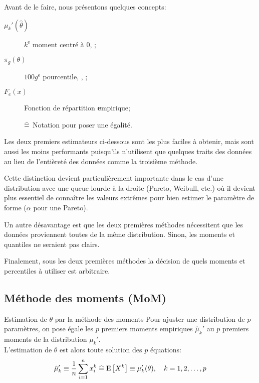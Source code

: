 \documentclass[10pt, french]{article}
\begin{document}
\begin{multicols*}{2}
Avant de le faire, nous présentons quelques concepts:
\begin{distributions}[Terminologie]
\begin{description}
	\item[$\mu_{k}'(\hat{\theta})$]	$k^{\text{e}}$ moment centré à 0, ;
	\item[$\pi_{g}(\theta)$]	$100g^{\text{e}}$ pourcentile, , ;
	\item[$F_{e}(x)$]	Fonction de répartition \textbf{e}mpirique;
	\item[]	$\equalhat$	Notation pour poser une égalité.
\end{description}
\end{distributions}

Les deux premiers estimateurs ci-dessous sont les plus faciles à obtenir, mais sont aussi les moins performants puisqu'ils n'utilisent que quelques traits des données au lieu de l'entièreté des données comme la troisième méthode.

Cette distinction devient particulièrement importante dans le cas d'une distribution avec une queue lourde à la droite (Pareto, Weibull, etc.) où il devient plus essentiel de connaître les valeurs extrêmes pour bien estimer le paramètre de forme ($\alpha$ pour une Pareto).

Un autre désavantage est que les deux premières méthodes nécessitent que les données proviennent toutes de la même distribution. Sinon, les moments et quantiles ne seraient pas clairs.

Finalement, sous les deux premières méthodes la décision de quels moments et percentiles à utiliser est arbitraire.

\subsection{Méthode des moments (MoM)}

\begin{algo}{Estimation de $\theta$ par la méthode des moments}
Pour ajuster une distribution de $p$ paramètres, on pose égale les $p$ premiers moments empiriques $\hat\mu_{k}'$ au $p$ premiers moments de la distribution $\mu_{k}'$.\\
L'estimation de $\theta$ est alors toute solution des $p$ équations:
\begin{equation*}
	\hat{\mu}_{k}' 
	\equiv	\frac{1}{n}\sum_{i = 1}^{n} x_{i}^{k}
	\equalhat	\esp{X^{k}}
	\equiv	\mu_{k}'(\theta), \quad	k = 1, 2, \dots, p
\end{equation*}
\end{algo}


\end{multicols*}
\end{document}
